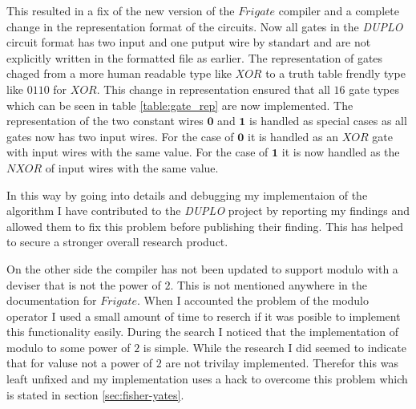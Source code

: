 \documentclass[twoside,11pt,openright]{report}
\newcommand{\DUPLO}{\textit{DUPLO} }
\begin{document}
\begin{table}
\centering
{}
\caption{A table of the 16 different gate types that can be used in a circuit of the type used in duplo}
\label{table:gate_rep}
\end{table}


This resulted in a fix of the new version of the $Frigate$ compiler and a complete change in the representation format of the circuits. Now all gates in the \DUPLO circuit format has two input and one putput wire by standart and are not explicitly written in the formatted file as earlier. The representation of gates chaged from a more human readable type like $XOR$ to a truth table frendly type like $0110$ for $XOR$. This change in representation ensured that all $16$ gate types which can be seen in table \ref{table:gate_rep} are now implemented. The representation of the two constant wires $\textbf{0}$ and $\textbf{1}$ is handled as special cases as all gates now has two input wires. For the case of $\textbf{0}$ it is handled as an $XOR$ gate with input wires with the same value. For the case of $\textbf{1}$ it is now handled as the $NXOR$ of input wires with the same value.

In this way by going into details and debugging my implementaion of the algorithm I have contributed to the \DUPLO project by reporting my findings and allowed them to fix this problem before publishing their finding. This has helped to secure a stronger overall research product.

On the other side the compiler has not been updated to support modulo with a deviser that is not the power of $2$. This is not mentioned anywhere in the documentation for $Frigate$. When I accounted the problem of the modulo operator I used a small amount of time to reserch if it was posible to implement this functionality easily. During the search I noticed that the implementation of modulo to some power of $2$ is simple. While the research I did seemed to indicate that for valuse not a power of $2$ are not trivilay implemented. Therefor this was leaft unfixed and my implementation uses a hack to overcome this problem which is stated in section \ref{sec:fisher-yates}.
\end{document}
